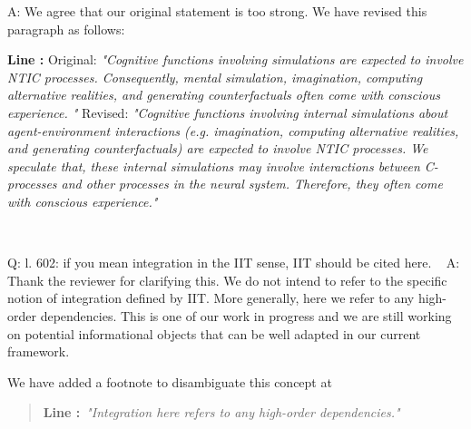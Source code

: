 \documentclass[utf8]{article}
\newcounter{cQuestion}[section]
\newenvironment{question}
    {\refstepcounter{cQuestion}\color{Blue}\noindent\newline Q\thecQuestion:}
    {~\newline}
\newenvironment{ans}  
    {\color{Black}\noindent A:}
    {~\newline}
\newcommand{\revise}[3]{
	\newline
	\newline
    \noindent
    \textbf{Line #1:}
    \newline
    Original:\newline
    \textit{"#2"}
    \newline
    \newline
    Revised:\newline
    \textit{"#3"}\newline}
\newcommand{\addnew}[2]{\blockcquote{}{\textbf{Line #1:}~\newline\textit{"#2"}}
}
\begin{document}
\begin{ans}
			We agree that our original statement is too strong. We have revised this paragraph as follows:
   			\revise{}{Cognitive functions involving simulations are expected to involve NTIC processes. Consequently, mental simulation, imagination, computing alternative realities, and generating counterfactuals often come with conscious experience. }{Cognitive functions involving internal simulations about agent-environment interactions (e.g. imagination, computing alternative realities, and generating counterfactuals) are expected to involve NTIC processes. We speculate that, these internal simulations may involve interactions between C-processes and other processes in the neural system. Therefore, they often come with conscious experience.}
    		
    	\end{ans}
    
    	\begin{question}
    		l. 602: if you mean integration in the IIT sense, IIT should be cited here.    	    		
    	\end{question}
    	\begin{ans}
			Thank the reviewer for clarifying this. We do not intend to refer to the specific notion of integration defined by IIT. More generally, here we refer to any high-order dependencies. 
			This is one of our work in progress and we are still working on potential informational objects that can be well adapted in our current framework. 
			
			We have added a footnote to disambiguate this concept at 
			\addnew{}{Integration here refers to any high-order dependencies.}
    	\end{ans}
    

    	
    
    
	
\end{document}
